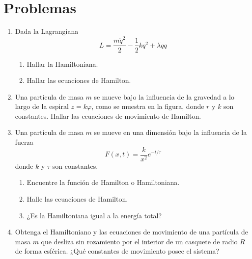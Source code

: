 \documentclass[../main]{subfiles}
\begin{document}
\section*{Problemas}
\begin{enumerate}
    \item Dada la Lagrangiana 
    \begin{equation}
        L=\dfrac{m\dot{q}^2}{2}-\dfrac{1}{2}kq^2+\lambda \dot{q}q
    \end{equation}
    \begin{enumerate}[label=(\alph*)]
        \item Hallar la Hamiltoniana.
        \item Hallar las ecuaciones de Hamilton.
    \end{enumerate}
    \item Una partícula de masa $m$ se mueve bajo la influencia de la gravedad a lo largo de la espiral $z=k\varphi$, como se muestra en la figura, donde $r$ y $k$ son constantes. Hallar las ecuaciones de movimiento de Hamilton.
    \item Una particula de masa $m$ se mueve en una dimensión bajo la influencia de la fuerza 
    \begin{equation}
        F(x, t)=\dfrac{k}{x^2}e^{-t/\tau}
    \end{equation}
    donde $k$ y $\tau$ son constantes.
    \begin{enumerate}[label=(\alph*)]
        \item Encuentre la función de Hamilton o Hamiltoniana.
        \item Halle las ecuaciones de Hamilton.
        \item ¿Es la Hamiltoniana igual a la energía total?
    \end{enumerate}
    \item Obtenga el Hamiltoniano y las ecuaciones de movimiento de una partícula de masa $m$ que desliza sin rozamiento por el interior de un casquete de radio $R$ de forma esférica. ¿Qué constantes de movimiento posee el sistema?
\end{enumerate}
\end{document}
